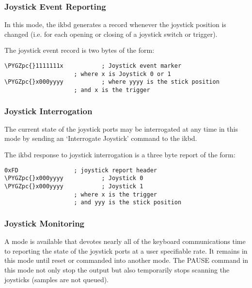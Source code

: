 \documentclass[a4paper,8pt,english]{sphinxmanual}
\def\PYGZpc{\char`\%}
\begin{document}
\subsubsection{Joystick Event Reporting}
\label{input/devices/atarikbd:joystick-event-reporting}
In this mode, the ikbd generates a record whenever the joystick position is
changed (i.e. for each opening or closing of a joystick switch or trigger).

The joystick event record is two bytes of the form:

\begin{Verbatim}[commandchars=\\\{\}]
\PYGZpc{}1111111x           ; Joystick event marker
                    ; where x is Joystick 0 or 1
\PYGZpc{}x000yyyy           ; where yyyy is the stick position
                    ; and x is the trigger
\end{Verbatim}


\subsubsection{Joystick Interrogation}
\label{input/devices/atarikbd:joystick-interrogation}
The current state of the joystick ports may be interrogated at any time in
this mode by sending an `Interrogate Joystick' command to the ikbd.

The ikbd response to joystick interrogation is a three byte report of the form:

\begin{Verbatim}[commandchars=\\\{\}]
0xFD                ; joystick report header
\PYGZpc{}x000yyyy           ; Joystick 0
\PYGZpc{}x000yyyy           ; Joystick 1
                    ; where x is the trigger
                    ; and yyy is the stick position
\end{Verbatim}


\subsubsection{Joystick Monitoring}
\label{input/devices/atarikbd:joystick-monitoring}
A mode is available that devotes nearly all of the keyboard communications
time to reporting the state of the joystick ports at a user specifiable rate.
It remains in this mode until reset or commanded into another mode. The PAUSE
command in this mode not only stop the output but also temporarily stops
scanning the joysticks (samples are not queued).
\end{document}
